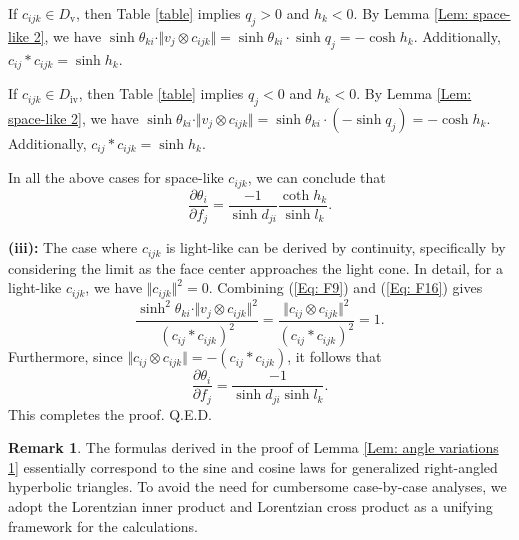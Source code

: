 \documentclass[12pt]{amsart}
\theoremstyle{definition}
\newtheorem{remark}[theorem]{Remark}
\def\qed{\hfill{Q.E.D.}\smallskip}
\begin{document}
If $c_{ijk}\in D_{\mathrm{v}}$, then Table \ref{table} implies $q_j>0$ and $h_k<0$.
By Lemma \ref{Lem: space-like 2}, we have $\sinh \theta_{ki}\cdot \Vert v_j\otimes c_{ijk}\Vert =\sinh \theta_{ki}\cdot\sinh q_j=-\cosh h_k$.
Additionally, $c_{ij}\ast c_{ijk}=\sinh h_k$.

If $c_{ijk}\in D_{\mathrm{iv}}$, then Table \ref{table} implies $q_j<0$ and $h_k<0$.
By Lemma \ref{Lem: space-like 2}, we have $\sinh \theta_{ki}\cdot \Vert v_j\otimes c_{ijk}\Vert =\sinh \theta_{ki}\cdot(-\sinh q_j)=-\cosh h_k$.
Additionally, $c_{ij}\ast c_{ijk}=\sinh h_k$.

In all the above cases for space-like $c_{ijk}$, we can conclude that
\begin{equation*}
\frac{\partial \theta_i}{\partial f_j}
=\frac{-1}{\sinh d_{ji}}\frac{\coth h_k}{\sinh l_k}.
\end{equation*}

\noindent\textbf{(iii):}
The case where $c_{ijk}$ is light-like can be derived by continuity, specifically by considering the limit as the face center approaches the light cone.
In detail, for a light-like $c_{ijk}$, we have $\Vert c_{ijk}\Vert ^2=0$.
Combining (\ref{Eq: F9}) and (\ref{Eq: F16}) gives
\begin{equation*}
\frac{\sinh^2 \theta_{ki}\cdot \Vert v_j\otimes c_{ijk}\Vert ^2}{(c_{ij}\ast c_{ijk})^2}
=\frac{\Vert c_{ij}\otimes c_{ijk}\Vert ^2}{(c_{ij}\ast c_{ijk})^2}=1.
\end{equation*}
Furthermore, since $\Vert c_{ij}\otimes c_{ijk}\Vert =-(c_{ij}\ast c_{ijk})$, it follows that
\begin{equation*}
\frac{\partial \theta_i}{\partial f_j}
=\frac{-1}{\sinh d_{ji}\sinh l_k}.
\end{equation*}
This completes the proof.
\qed

\begin{remark}
The formulas derived in the proof of Lemma \ref{Lem: angle variations 1} essentially correspond to the sine and cosine laws for generalized right-angled hyperbolic triangles. 
To avoid the need for cumbersome case-by-case analyses, 
we adopt the Lorentzian inner product and Lorentzian cross product as a unifying framework for the calculations.
\end{remark}
\end{document}
